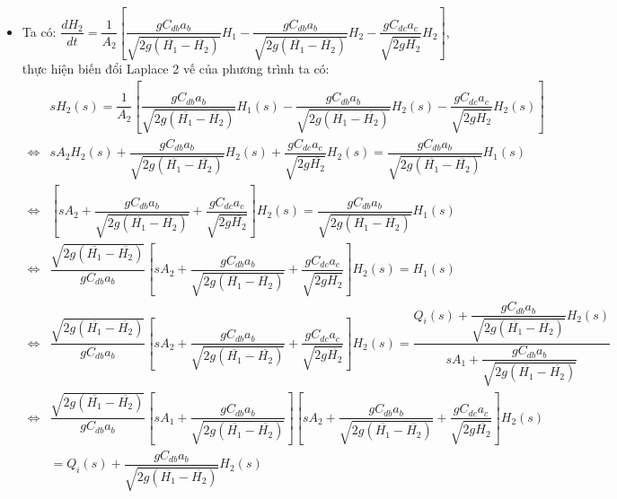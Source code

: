 \begin{enumerate}[\it a.]
\begin{itemize}
                \item Ta có: $\dfrac{dH_2}{dt} = \dfrac{1}{A_2} \left[{\dfrac{g C_{db}a_b}{\sqrt{2g(\overline{H_1} - \overline{H_2})}} H_1 - \dfrac{g C_{db}a_b}{\sqrt{2g(\overline{H_1} - \overline{H_2})}} H_2 - \dfrac{g C_{dc}a_c}{\sqrt{2g\overline{H_2}}} H_2}\right]$, thực hiện biến đổi Laplace 2 vế của phương trình ta có:
                    \begin{align}
                        & s H_2(s) = \dfrac{1}{A_2} \left[{\dfrac{g C_{db}a_b}{\sqrt{2g(\overline{H_1} - \overline{H_2})}} H_1(s) - \dfrac{g C_{db}a_b}{\sqrt{2g(\overline{H_1} - \overline{H_2})}} H_2(s) - \dfrac{g C_{dc}a_c}{\sqrt{2g\overline{H_2}}} H_2(s)}\right] \\
                        \Longleftrightarrow & s A_2 H_2(s) + \dfrac{g C_{db}a_b}{\sqrt{2g(\overline{H_1} - \overline{H_2})}} H_2(s) + \dfrac{g C_{dc}a_c}{\sqrt{2g\overline{H_2}}} H_2(s) = \dfrac{g C_{db}a_b}{\sqrt{2g(\overline{H_1} - \overline{H_2})}} H_1(s) \\
                        \Longleftrightarrow & \left[{s A_2 + \dfrac{g C_{db}a_b}{\sqrt{2g(\overline{H_1} - \overline{H_2})}} + \dfrac{g C_{dc}a_c}{\sqrt{2g\overline{H_2}}}}\right] H_2(s) = \dfrac{g C_{db}a_b}{\sqrt{2g(\overline{H_1} - \overline{H_2})}} H_1(s) \\
                        \Longleftrightarrow & \dfrac{\sqrt{2g(\overline{H_1} - \overline{H_2})}}{g C_{db}a_b} \left[{s A_2 + \dfrac{g C_{db}a_b}{\sqrt{2g(\overline{H_1} - \overline{H_2})}} + \dfrac{g C_{dc}a_c}{\sqrt{2g\overline{H_2}}}}\right] H_2(s) = H_1(s) \\
                        \Longleftrightarrow & \dfrac{\sqrt{2g(\overline{H_1} - \overline{H_2})}}{g C_{db}a_b} \left[{s A_2 + \dfrac{g C_{db}a_b}{\sqrt{2g(\overline{H_1} - \overline{H_2})}} + \dfrac{g C_{dc}a_c}{\sqrt{2g\overline{H_2}}}}\right] H_2(s) = \dfrac{Q_i(s) + \dfrac{gC_{db}a_b}{\sqrt{2g(\overline{H_1} - \overline{H_2})}} H_2(s)}{s A_1 + \dfrac{gC_{db}a_b}{\sqrt{2g(\overline{H_1} - \overline{H_2})}}} \\
                        \Longleftrightarrow & \dfrac{\sqrt{2g(\overline{H_1} - \overline{H_2})}}{g C_{db}a_b} \left[{s A_1 + \dfrac{gC_{db}a_b}{\sqrt{2g(\overline{H_1} - \overline{H_2})}}}\right] \left[{s A_2 + \dfrac{g C_{db}a_b}{\sqrt{2g(\overline{H_1} - \overline{H_2})}} + \dfrac{g C_{dc}a_c}{\sqrt{2g\overline{H_2}}}}\right] H_2(s) \nonumber \\
                        & = Q_i(s) + \dfrac{gC_{db}a_b}{\sqrt{2g(\overline{H_1} - \overline{H_2})}} H_2(s) \\

\end{align}
\end{itemize}
\end{enumerate}
